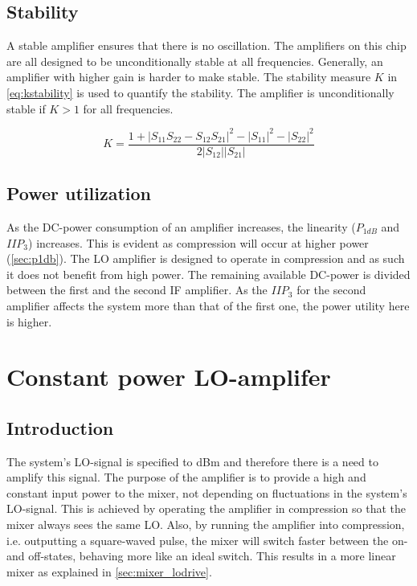 		\subsection{Stability}
			A stable amplifier ensures that there is no oscillation.\autocite{grosch99} The amplifiers on this chip are all designed to be unconditionally stable at all frequencies. Generally, an amplifier with higher gain is harder to make stable. The stability measure $K$ in \autoref{eq:kstability} is used to quantify the stability. The amplifier is unconditionally stable if $K>1$ for all frequencies.

			\begin{equation}\label{eq:kstability}
				K=\frac{1+|S_{11}S_{22}-S_{12}S_{21}|^2-|S_{11}|^2-|S_{22}|^2}{2|S_{12}||S_{21}|}
			\end{equation}

		\subsection{Power utilization}\label{sec:power}
			As the DC-power consumption of an amplifier increases, the linearity ($P_{1dB}$ and $IIP_3$) increases. This is evident as compression will occur at higher power (\autoref{sec:p1db}). The LO amplifier is designed to operate in compression and as such it does not benefit from high power. The remaining available DC-power is divided between the first and the second IF amplifier. As the $IIP_3$ for the second amplifier affects the system more than that of the first one, the power utility here is higher.

	\section{Constant power LO-amplifer}\label{sec:lo_amp}
		\subsection{Introduction}
			The system's LO-signal is specified to \unit[-5--0]{dBm} and therefore there is a need to amplify this signal. The purpose of the amplifier is to provide a high and constant input power to the mixer, not depending on fluctuations in the system's LO-signal. This is achieved by operating the amplifier in compression so that the mixer always sees the same LO. Also, by running the amplifier into compression, i.e. outputting a square-waved pulse, the mixer will switch faster between the on- and off-states, behaving more like an ideal switch. This results in a more linear mixer as explained in \autoref{sec:mixer_lodrive}.\autocite{vice03} %



